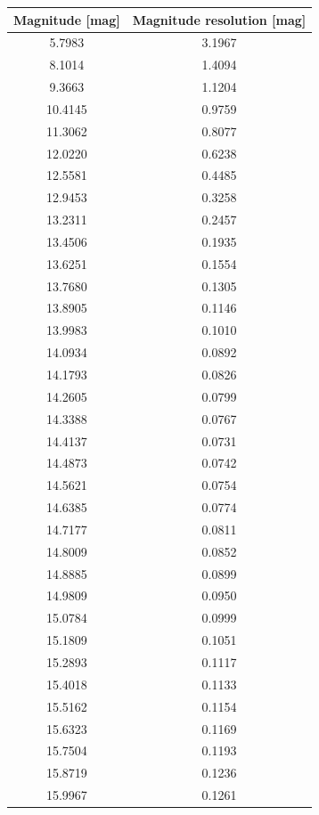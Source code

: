 \documentclass[fleqn,usenatbib]{mnras}
\begin{document}
\label{appexdix:magnitude-resolution}
\begin{table}
    \centering
    \begin{tabular}{c|c}
        Magnitude [mag] & Magnitude resolution [mag] \\\hline\hline
        5.7983 & 3.1967\\
        8.1014 & 1.4094\\
        9.3663 & 1.1204\\
        10.4145 & 0.9759\\
        11.3062 & 0.8077\\\hline
        12.0220 & 0.6238\\
        12.5581 & 0.4485\\
        12.9453 & 0.3258\\
        13.2311 & 0.2457\\
        13.4506 & 0.1935\\\hline
        13.6251 & 0.1554\\
        13.7680 & 0.1305\\
        13.8905 & 0.1146\\
        13.9983 & 0.1010\\
        14.0934 & 0.0892\\\hline
        14.1793 & 0.0826\\
        14.2605 & 0.0799\\
        14.3388 & 0.0767\\
        14.4137 & 0.0731\\
        14.4873 & 0.0742\\\hline
        14.5621 & 0.0754\\
        14.6385 & 0.0774\\
        14.7177 & 0.0811\\
        14.8009 & 0.0852\\
        14.8885 & 0.0899\\\hline
        14.9809 & 0.0950\\
        15.0784 & 0.0999\\
        15.1809 & 0.1051\\
        15.2893 & 0.1117\\
        15.4018 & 0.1133\\\hline
        15.5162 & 0.1154\\
        15.6323 & 0.1169\\
        15.7504 & 0.1193\\
        15.8719 & 0.1236\\
        15.9967 & 0.1261\\\hline

\end{tabular}
\end{table}
\end{document}
